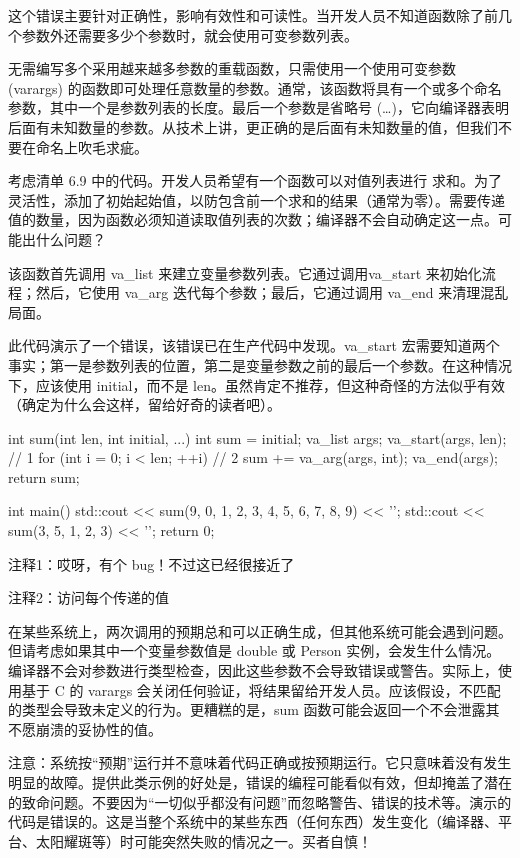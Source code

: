 这个错误主要针对正确性，影响有效性和可读性。当开发人员不知道函数除了前几个参数外还需要多少个参数时，就会使用可变参数列表。


无需编写多个采用越来越多参数的重载函数，只需使用一个使用可变参数 (varargs) 的函数即可处理任意数量的参数。通常，该函数将具有一个或多个命名参数，其中一个是参数列表的长度。最后一个参数是省略号 (…)，它向编译器表明后面有未知数量的参数。从技术上讲，更正确的是后面有未知数量的值，但我们不要在命名上吹毛求疵。

考虑清单 6.9 中的代码。开发人员希望有一个函数可以对值列表进行 求和。为了灵活性，添加了初始起始值，以防包含前一个求和的结果（通常为零）。需要传递值的数量，因为函数必须知道读取值列表的次数；编译器不会自动确定这一点。可能出什么问题？

该函数首先调用 va\_list 来建立变量参数列表。它通过调用va\_start 来初始化流程；然后，它使用 va\_arg 迭代每个参数；最后，它通过调用 va\_end 来清理混乱局面。

此代码演示了一个错误，该错误已在生产代码中发现。va\_start 宏需要知道两个事实；第一是参数列表的位置，第二是变量参数之前的最后一个参数。在这种情况下，应该使用 initial，而不是 len。虽然肯定不推荐，但这种奇怪的方法似乎有效（确定为什么会这样，留给好奇的读者吧）。


\begin{cpp}
int sum(int len, int initial, ...) {
  int sum = initial;
  va_list args;
  va_start(args, len); // 1
  for (int i = 0; i < len; ++i) // 2
    sum += va_arg(args, int);
  va_end(args);
  return sum;
}

int main() {
  std::cout << sum(9, 0, 1, 2, 3, 4, 5, 6, 7, 8, 9) << '\n';
  std::cout << sum(3, 5, 1, 2, 3) << '\n';
  return 0;
}
\end{cpp}

{\footnotesize
注释1：哎呀，有个 bug！不过这已经很接近了

注释2：访问每个传递的值
}


在某些系统上，两次调用的预期总和可以正确生成，但其他系统可能会遇到问题。但请考虑如果其中一个变量参数值是 double 或 Person 实例，会发生什么情况。编译器不会对参数进行类型检查，因此这些参数不会导致错误或警告。实际上，使用基于 C 的 varargs 会关闭任何验证，将结果留给开发人员。应该假设，不匹配的类型会导致未定义的行为。更糟糕的是，sum 函数可能会返回一个不会泄露其不愿崩溃的妥协性的值。

注意：系统按“预期”运行并不意味着代码正确或按预期运行。它只意味着没有发生明显的故障。提供此类示例的好处是，错误的编程可能看似有效，但却掩盖了潜在的致命问题。不要因为“一切似乎都没有问题”而忽略警告、错误的技术等。演示的代码是错误的。这是当整个系统中的某些东西（任何东西）发生变化（编译器、平台、太阳耀斑等）时可能突然失败的情况之一。买者自慎！

